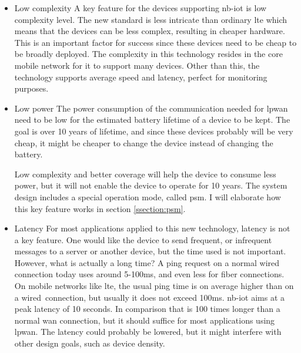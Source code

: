 \documentclass[USenglish]{ifimaster}  %
\begin{document}
\begin{itemize}
  \item Low complexity \newline %
  A key feature for the devices supporting \acrshort{nb-iot} is low complexity level. The new standard is less intricate than ordinary \acrshort{lte} which means that the devices can be less complex, resulting in cheaper hardware. This is an important factor for success since these devices need to be cheap to be broadly deployed. The complexity in this technology resides in the core mobile network for it to support many devices. Other than this, the technology supports average speed and latency, perfect for monitoring purposes.

  \item Low power \newline
  The power consumption of the communication needed for \acrshort{lpwan} need to be low for the estimated battery lifetime of a device to be kept. The goal is over 10 years of lifetime, and since these devices probably will be very cheap, it might be cheaper to change the device instead of changing the battery.

  Low complexity and better coverage will help the device to consume less power, but it will not enable the device to operate for 10 years. The system design includes a special operation mode, called \acrlong{psm}. I will elaborate how this key feature works in section \vref{ssection:psm}.

  \item Latency \newline
  For most applications applied to this new technology, latency is not a key feature. One would like the device to send frequent, or infrequent messages to a server or another device, but the time used is not important. However, what is actually a long time? A ping request on a normal wired connection today uses around 5-100ms, and even less for fiber connections. On mobile networks like \acrshort{lte}, the usual ping time is on average higher than on a wired connection, but usually it does not exceed 100ms. \acrshort{nb-iot} aims at a peak latency of 10 seconds. In comparison that is 100 times longer than a normal \acrshort{wan} connection, but it should suffice for most applications using \acrshort{lpwan}. The latency could probably be lowered, but it might interfere with other design goals, such as device density.


\end{itemize}
\end{document}
